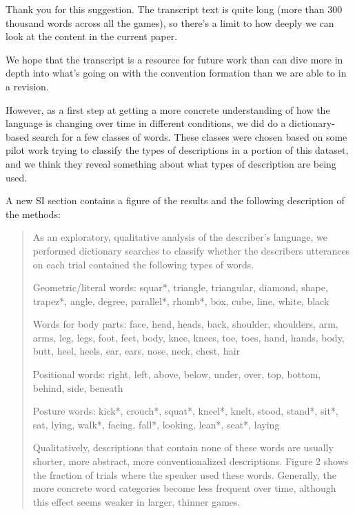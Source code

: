\documentclass{stanfordletter}
\newcommand{\revised}[1]{\begin{quote}	#1 \end{quote}}
\begin{document}
\begin{letter}{}
          Thank you for this suggestion. The transcript text is quite long (more than 300 thousand words across all the games), so there's a limit to how deeply we can look at the content in the current paper. 
          
          We hope that the transcript is a resource for future work than can dive more in depth into what's going on with the convention formation than we are able to in a revision. 
          
          However, as a first step at getting a more concrete understanding of how the language is changing over time in different conditions, we did do a dictionary-based search for a few classes of words. These classes were chosen based on some pilot work trying to classify the types of descriptions in a portion of this dataset, and we think they reveal something about what types of description are being used. 
          
                    A new SI section contains a figure of the results and the following description of the methods:
          
          \revised{As an exploratory, qualitative analysis of the describer's language, we performed dictionary searches to classify whether the describers utterances on each trial contained the following types of words. 
          	
          	Geometric/literal words: squar*, triangle, triangular, diamond, shape, trapez*, angle, degree, parallel*, rhomb*, box, cube, line, white, black
          	
          	Words for body parts: face, head, heads, back, shoulder, shoulders, arm, arms, leg, legs, foot, feet, body, knee, knees, toe, toes, hand, hands, body, butt, heel, heels, ear, ears, nose, neck, chest, hair
          	
          	Positional words: right, left, above, below, under, over, top, bottom, behind, side, beneath
          	
          	Posture words: kick*, crouch*, squat*, kneel*, knelt, stood, stand*, sit*, sat, lying, walk*, facing, fall*, looking, lean*, seat*, laying
          	
          	Qualitatively, descriptions that contain none of these words are usually shorter, more abstract, more conventionalized descriptions. 
          	Figure 2 shows the fraction of trials where the speaker used these words. Generally, the more concrete word categories become less frequent over time, although this effect seems weaker in larger, thinner games. }
          

\end{letter}
\end{document}
